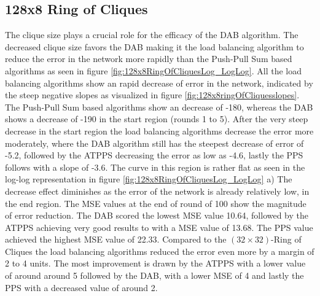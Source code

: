 \subsection{128x8 Ring of Cliques}\label{subsec:128_8ROC}
The clique size plays a crucial role for the efficacy of the DAB algorithm. The decreased clique size favors the DAB making it the load balancing algorithm to reduce the error in the network more rapidly than the Push-Pull Sum based algorithms as seen in figure \ref{fig:128x8RingOfCliquesLog_LogLog}. All the load balancing algorithms show an rapid decrease of error in the network, indicated by the steep negative slopes as visualized in figure \ref{fig:128x8ringOfCliquesslopes}. The Push-Pull Sum based algorithms show an decrease of -180, whereas the DAB shows a decrease of -190 in the start region (rounds 1 to 5). After the very steep decrease in the start region the load balancing algorithms decrease the error more moderately, where the DAB algorithm still has the steepest decrease of error of -5.2, followed by the ATPPS decreasing the error as low as -4.6, lastly the PPS follows with a slope of -3.6. The curve in this region is rather flat as seen in the log-log representation in figure \ref{fig:128x8RingOfCliquesLog_LogLog} a) The decrease effect diminishes as the error of the network is already relatively low, in the end region. The MSE values at the end of round of 100 show the magnitude of error reduction. The DAB scored the lowest MSE value 10.64, followed by the ATPPS achieving very good results to with a MSE value of 13.68. The PPS value achieved the highest MSE value of 22.33. Compared to the $(32\times 32)$-Ring of Cliques the load balancing algorithms reduced the error even more by a margin of 2 to 4 units. The most improvement is drawn by the ATPPS with a lower value of around around 5 followed by the DAB, with a lower MSE of 4 and lastly the PPS with a decreased value of around 2.

